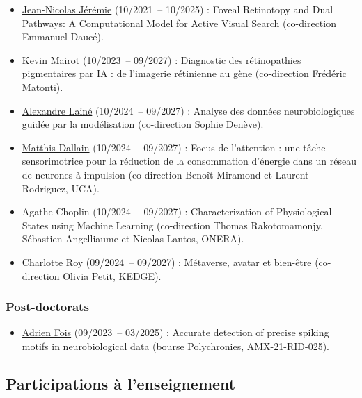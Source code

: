 \documentclass[11pt,french,a4paper,oneside]{article}
\begin{document}
\begin{itemize}
    \item \href{https://laurentperrinet.github.io/author/jean-nicolas-jeremie/}{Jean-Nicolas Jérémie} (10/2021~-- 10/2025) : \og Foveal Retinotopy and Dual Pathways: A Computational Model for Active Visual Search \fg{} (co-direction Emmanuel Daucé).
    \item \href{https://laurentperrinet.github.io/author/kevin-mairot/}{Kevin Mairot} (10/2023~-- 09/2027) : \og Diagnostic des rétinopathies pigmentaires par IA : de l'imagerie rétinienne au gène \fg{} (co-direction Frédéric Matonti).
    \item \href{https://laurentperrinet.github.io/author/alexandre-laine/}{Alexandre Lainé} (10/2024~-- 09/2027) : \og Analyse des données neurobiologiques guidée par la modélisation \fg{} (co-direction Sophie Denève).
    \item \href{https://laurentperrinet.github.io/author/matthis-dallain/}{Matthis Dallain} (10/2024~-- 09/2027) : \og Focus de l'attention : une tâche sensorimotrice pour la réduction de la consommation d'énergie dans un réseau de neurones à impulsion \fg{} (co-direction Benoît Miramond et Laurent Rodriguez, UCA).
    \item Agathe Choplin (10/2024~-- 09/2027) : \og Characterization of Physiological States using Machine Learning \fg{} (co-direction Thomas Rakotomamonjy, Sébastien Angelliaume et Nicolas Lantos, ONERA).
    \item Charlotte Roy (09/2024~-- 09/2027) : \og Métaverse, avatar et bien-être \fg{} (co-direction Olivia Petit, KEDGE).
\end{itemize}

\subsubsection*{Post-doctorats}

\begin{itemize}
    \item \href{https://laurentperrinet.github.io/author/adrien-fois/}{Adrien Fois} (09/2023~-- 03/2025) : \og Accurate detection of precise spiking motifs in neurobiological data \fg{} (bourse Polychronies, AMX-21-RID-025).
\end{itemize}

\subsection{Participations à l'enseignement}
\end{document}
